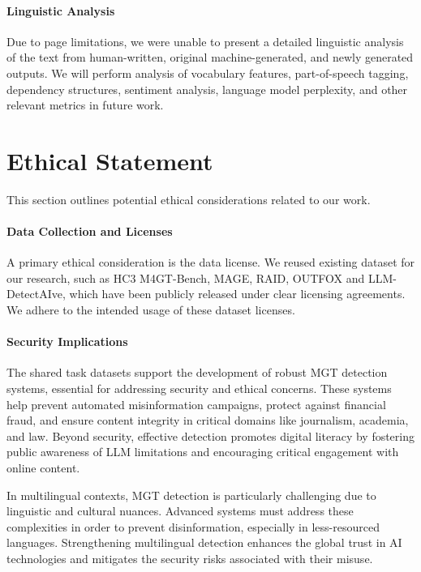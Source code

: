 \paragraph{Linguistic Analysis}
Due to page limitations, we were unable to present a detailed linguistic analysis of the text from human-written, original machine-generated, and newly generated outputs. We will perform analysis of vocabulary features, part-of-speech tagging, dependency structures, sentiment analysis, language model perplexity, and other relevant metrics in future work.


\section*{Ethical Statement}
This section outlines potential ethical considerations related to our work.

\paragraph{Data Collection and Licenses}
A primary ethical consideration is the data license. We reused existing dataset for our research, such as HC3 M4GT-Bench, MAGE, RAID, OUTFOX and LLM-DetectAIve, which have been publicly released under clear licensing agreements. We adhere to the intended usage of these dataset licenses.

\paragraph{Security Implications}
The shared task datasets support the development of robust MGT detection systems, essential for addressing security and ethical concerns. These systems help prevent automated misinformation campaigns, protect against financial fraud, and ensure content integrity in critical domains like journalism, academia, and law. Beyond security, effective detection promotes digital literacy by fostering public awareness of LLM limitations and encouraging critical engagement with online content.

In multilingual contexts, MGT detection is particularly challenging due to linguistic and cultural nuances. Advanced systems must address these complexities in order to prevent disinformation, especially in less-resourced languages. Strengthening multilingual detection enhances the global trust in AI technologies and mitigates the security risks associated with their misuse.

